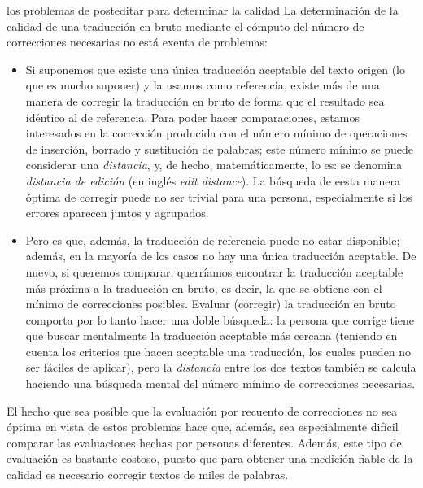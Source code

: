 \begin{persabermes}{los problemas de posteditar para determinar la calidad} La determinación de la calidad de una traducción en bruto mediante el cómputo del número de correcciones necesarias no está exenta de problemas: \begin{itemize} \item Si suponemos que existe una única traducción aceptable del texto origen (lo que es mucho suponer) y la usamos como referencia, existe más de una manera de corregir la traducción en bruto de forma que el resultado sea idéntico al de referencia. Para poder hacer comparaciones, estamos interesados en la corrección producida con el número mínimo de operaciones de inserción, borrado y sustitución de palabras; este número mínimo se puede considerar una \emph{distancia}, y, de hecho, matemáticamente, lo es: se denomina \emph{distancia de edición} (en inglés \emph{edit distance}). La búsqueda de eesta manera óptima de corregir puede no ser trivial para una persona, especialmente si los errores aparecen juntos y agrupados. \item Pero es que, además, la traducción de referencia puede no estar disponible; además, en la mayoría de los casos no hay una única traducción aceptable. De nuevo, si queremos comparar, querríamos encontrar la traducción aceptable más próxima a la traducción en bruto, es decir, la que se obtiene con el mínimo de correcciones posibles. Evaluar (corregir) la traducción en bruto comporta por lo tanto hacer una doble búsqueda: la persona que corrige tiene que buscar mentalmente la traducción aceptable más cercana (teniendo en cuenta los criterios que hacen aceptable una traducción, los cuales pueden no ser fáciles de aplicar), pero la \emph{distancia} entre los dos textos también se calcula haciendo una búsqueda mental del número mínimo de correcciones necesarias. \end{itemize} El hecho que sea posible que la evaluación por recuento de correcciones no sea óptima en vista de estos problemas hace que, además, sea especialmente difícil comparar las evaluaciones hechas por personas diferentes. Además, este tipo de evaluación es bastante costoso, puesto que para obtener una medición fiable de la calidad es necesario corregir textos de miles de palabras. \end{persabermes} 

